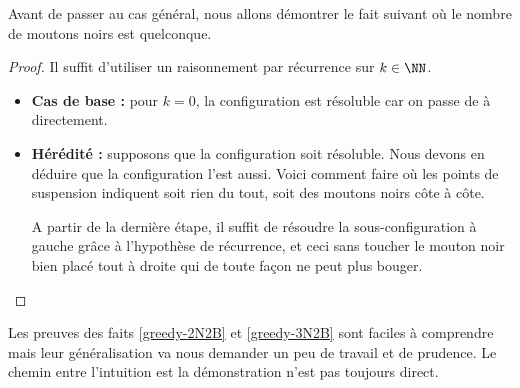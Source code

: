 Avant de passer au cas général, nous allons démontrer le fait suivant où le nombre de moutons noirs est quelconque.




\begin{proof}
    Il suffit d'utiliser un raisonnement par récurrence sur $k \in \NN$.

    \begin{itemize}[label=\small\textbullet]
        \item \textbf{Cas de base :} pour $k = 0$, la configuration  est résoluble car on passe de  à  directement.


        \item \textbf{Hérédité :} supposons que la configuration  soit résoluble. Nous devons en déduire que la configuration  l'est aussi. Voici comment faire où les points de suspension indiquent soit rien du tout, soit des moutons noirs côte à côte.

        \noindent
        A partir de la dernière étape, il suffit de résoudre la sous-configuration  à gauche grâce à l'hypothèse de récurrence, et ceci sans toucher le mouton noir bien placé tout à droite qui de toute façon ne peut plus bouger.
    \end{itemize}
\end{proof}


Les preuves des faits \ref{greedy-2N2B} et \ref{greedy-3N2B} sont faciles à comprendre mais leur généralisation va nous demander un peu de travail et de prudence. Le chemin entre l'intuition est la démonstration n'est pas toujours direct.
